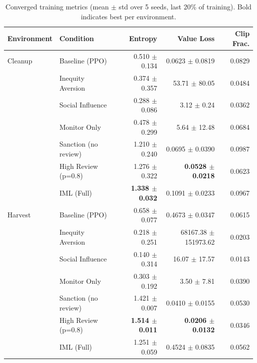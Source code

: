 \begin{table}[htbp]
\caption{Converged training metrics (mean $\pm$ std over 5 seeds, last 20\% of training). Bold indicates best per environment.}
\label{tab:converged_training}
\centering
\footnotesize
\begin{tabular}{llrrr}
\toprule
\textbf{Environment} & \textbf{Condition} & \textbf{Entropy} & \textbf{Value Loss} & \textbf{Clip Frac.} \\
\midrule
  Cleanup & Baseline (PPO) & 0.510 $\pm$ 0.134 & 0.0623 $\pm$ 0.0819 & 0.0829 \\
   & Inequity Aversion & 0.374 $\pm$ 0.357 & 53.71 $\pm$ 80.05 & 0.0484 \\
   & Social Influence & 0.288 $\pm$ 0.086 & 3.12 $\pm$ 0.24 & 0.0362 \\
   & Monitor Only & 0.478 $\pm$ 0.299 & 5.64 $\pm$ 12.48 & 0.0684 \\
   & Sanction (no review) & 1.210 $\pm$ 0.240 & 0.0695 $\pm$ 0.0390 & 0.0987 \\
   & High Review (p=0.8) & 1.276 $\pm$ 0.322 & \textbf{0.0528 $\pm$ 0.0218} & 0.0623 \\
   & IML (Full) & \textbf{1.338 $\pm$ 0.032} & 0.1091 $\pm$ 0.0233 & 0.0967 \\
\midrule
  Harvest & Baseline (PPO) & 0.658 $\pm$ 0.077 & 0.4673 $\pm$ 0.0347 & 0.0615 \\
   & Inequity Aversion & 0.218 $\pm$ 0.251 & 68167.38 $\pm$ 151973.62 & 0.0203 \\
   & Social Influence & 0.140 $\pm$ 0.314 & 16.07 $\pm$ 17.57 & 0.0143 \\
   & Monitor Only & 0.303 $\pm$ 0.192 & 3.50 $\pm$ 7.81 & 0.0390 \\
   & Sanction (no review) & 1.421 $\pm$ 0.007 & 0.0410 $\pm$ 0.0155 & 0.0530 \\
   & High Review (p=0.8) & \textbf{1.514 $\pm$ 0.011} & \textbf{0.0206 $\pm$ 0.0132} & 0.0346 \\
   & IML (Full) & 1.251 $\pm$ 0.059 & 0.4524 $\pm$ 0.0835 & 0.0562 \\
\bottomrule
\end{tabular}
\end{table}
